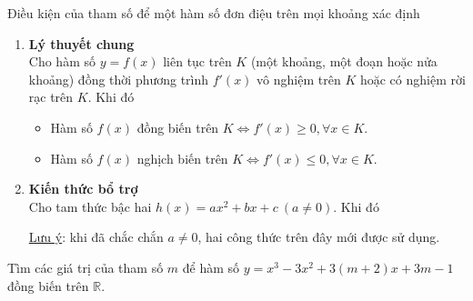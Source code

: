 	\begin{dang}{Điều kiện của tham số để một hàm số đơn điệu trên mọi khoảng xác định}
		\begin{enumerate}[\bf A.]
			\item \textbf{Lý thuyết chung}\\
			Cho hàm số $y=f(x)$ liên tục trên $K$ (một khoảng, một đoạn hoặc nửa khoảng) đồng thời phương trình $f'(x)$ vô nghiệm trên $K$ hoặc có nghiệm rời rạc trên $K$. Khi đó
			\begin{itemize}
				\item Hàm số $f(x)$ đồng biến trên $K \Leftrightarrow f'(x) \geqslant 0, \forall x\in K$.
				\item Hàm số $f(x)$ nghịch biến trên $K \Leftrightarrow f'(x) \leq  0, \forall x\in K$.
			\end{itemize}
			\item \textbf{Kiến thức bổ trợ}\\
			Cho tam thức bậc hai $h(x)=ax^2+bx+c~(a \neq 0)$. Khi đó
			\begin{itemize} \end{itemize}
			\underline{Lưu ý}: khi đã chắc chắn $a \neq 0$, hai công thức trên đây mới được sử dụng.
		\end{enumerate}
	\end{dang}
	\begin{vd}%
		Tìm các giá trị của tham số $m$ để hàm số $y=x^3-3x^2+3(m+2)x+3m-1$ đồng biến trên $\mathbb{R}$.
	\end{vd}
